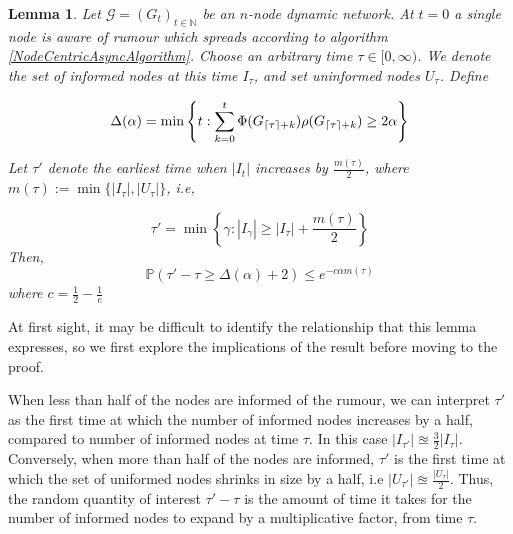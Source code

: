 \documentclass[a4paper,11pt]{article}
\newtheorem{lemma}[theorem]{Lemma}
\theoremstyle{definition}
\DeclarePairedDelimiter\ceil{\lceil}{\rceil}
\begin{document}
\begin{lemma} \label{AsyncIncreaseLemma}
	Let $\mathcal{G}=(G_t)_{t \in \mathbb{N}}$ be an $n$-node dynamic network. At $t=0$ a single node is aware of rumour which spreads according to algorithm \ref{NodeCentricAsyncAlgorithm}. Choose an arbitrary time $\tau \in [0, \infty)$. We denote the set of informed nodes at this time $I_\tau$, and set uninformed nodes $U_\tau$.
	\noindent
	Define 
	
	$$
	\Delta(\alpha) = \min \left\{t: \sum_{k=0}^t \Phi(G_{\ceil{\tau}+k})\rho(G_{\ceil{\tau}+k}) \geq 2 \alpha \right\}
	$$

	\noindent
	Let $\tau'$ denote the earliest time when $|I_t|$ increases by $\frac{m(\tau)}{2}$, where $m(\tau) := \min\{|I_\tau|, |U_\tau|\}$, i.e,

	$$
		\tau' = \min\left\{\gamma : |I_{\gamma}| \geq |I_\tau| + \frac{m(\tau)}{2}\right\}
	$$
	\noindent
	Then, 
	$$
		\mathbb{P}(\tau' - \tau \geq \Delta(\alpha) + 2) \leq e^{-c\alpha m(\tau)}
	$$
	\noindent
	where $c = \frac{1}{2} - \frac{1}{e}$
\end{lemma}


At first sight, it may be difficult to identify the relationship that this lemma expresses, so we first explore the implications of the result before moving to the proof.

When less than half of the nodes are informed of the rumour, we can interpret $\tau'$ as the first time at which the number of informed nodes increases by a half, compared to number of informed nodes at time $\tau$. In this case $|I_{\tau'}| \approxeq \frac{3}{2} |I_\tau|$. Conversely, when more than half of the nodes are informed, $\tau'$ is the first time at which the set of uniformed nodes shrinks in size by a half, i.e $|U_{\tau'}| \approxeq \frac{|U_\tau|}{2}$. Thus, the random quantity of interest $\tau'-\tau$ is the amount of time it takes for the number of informed nodes to expand by a multiplicative factor, from time $\tau$. 
\end{document}

